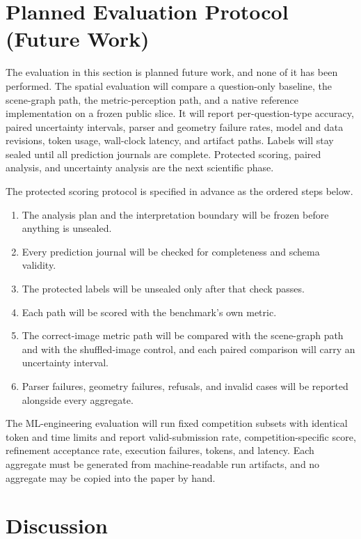 \documentclass{article}
\begin{document}
\section{Planned Evaluation Protocol (Future Work)}
\label{sec:planned}

The evaluation in this section is planned future work, and none of it has been performed. The spatial evaluation will compare a question-only baseline, the scene-graph path, the metric-perception path, and a native reference implementation on a frozen public slice. It will report per-question-type accuracy, paired uncertainty intervals, parser and geometry failure rates, model and data revisions, token usage, wall-clock latency, and artifact paths. Labels will stay sealed until all prediction journals are complete. Protected scoring, paired analysis, and uncertainty analysis are the next scientific phase.

The protected scoring protocol is specified in advance as the ordered steps below.
\begin{enumerate}[leftmargin=*,nosep]
  \item The analysis plan and the interpretation boundary will be frozen before anything is unsealed.
  \item Every prediction journal will be checked for completeness and schema validity.
  \item The protected labels will be unsealed only after that check passes.
  \item Each path will be scored with the benchmark's own metric.
  \item The correct-image metric path will be compared with the scene-graph path and with the shuffled-image control, and each paired comparison will carry an uncertainty interval.
  \item Parser failures, geometry failures, refusals, and invalid cases will be reported alongside every aggregate.
\end{enumerate}

The ML-engineering evaluation will run fixed competition subsets with identical token and time limits and report valid-submission rate, competition-specific score, refinement acceptance rate, execution failures, tokens, and latency. Each aggregate must be generated from machine-readable run artifacts, and no aggregate may be copied into the paper by hand.

\section{Discussion}
\label{sec:discussion}
\end{document}
